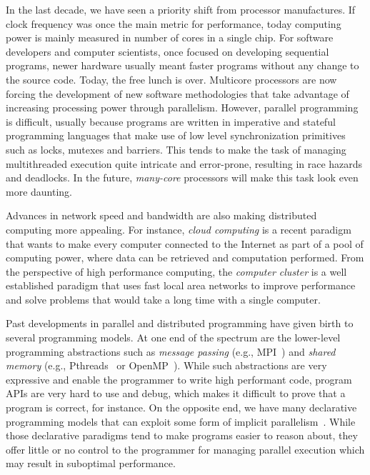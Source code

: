 
In the last decade, we have seen a priority shift from processor manufactures.
If clock frequency was once the main metric for performance, today computing
power is mainly measured in number of cores in a single chip.  For software developers
and computer scientists, once focused on developing sequential programs, newer
hardware usually meant faster programs without any change to the source code.
Today, the free lunch is over. Multicore processors are now forcing the
development of new software methodologies that take advantage of increasing
processing power through parallelism.  However, parallel programming is
difficult, usually because programs are written in imperative and stateful
programming languages that make use of low level synchronization primitives such
as locks, mutexes and barriers. This tends to make the task of managing
multithreaded execution quite intricate and error-prone, resulting in race
hazards and deadlocks.  In the future, \emph{many-core} processors will make
this task look even more daunting.

Advances in network speed and bandwidth are also making distributed computing
more appealing. For instance, \emph{cloud computing} is a recent paradigm that
wants to make every computer connected to the Internet as part of a pool of
computing power, where data can be retrieved and computation performed. From the
perspective of high performance computing, the \emph{computer cluster} is a well
established paradigm that uses fast local area networks to improve performance
and solve problems that would take a long time with a single computer.

Past developments in parallel and distributed programming have given birth to
several programming models.  At one end of the spectrum are the lower-level
programming abstractions such as \emph{message passing} (e.g.,
MPI~\cite{gabriel04-open-mpi}) and \emph{shared memory} (e.g.,
Pthreads~\cite{Butenhof:1997:PPT:263953} or
OpenMP~\cite{Chapman-2007-UOP-1370966}).  While such abstractions are very
expressive and enable the programmer to write high performant code, program APIs
are very hard to use and debug, which makes it difficult to prove that a program
is correct, for instance. On the opposite end, we have many declarative
programming models that can exploit some form of implicit
parallelism~\cite{Blelloch:1996:PPA:227234.227246}.  While those declarative
paradigms tend to make programs easier to reason about, they offer little or no
control to the programmer for managing parallel execution which may result in
suboptimal performance.

